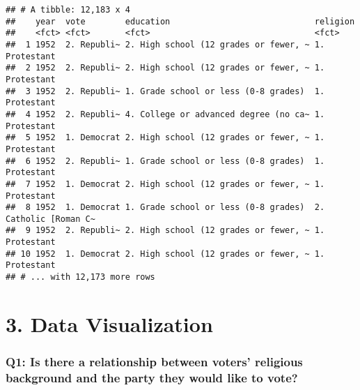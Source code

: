 \documentclass[
]{article}
\newenvironment{Shaded}{\begin{snugshade}}{\end{snugshade}}
\newcommand{\DataTypeTok}[1]{\textcolor[rgb]{0.13,0.29,0.53}{#1}}
\newcommand{\KeywordTok}[1]{\textcolor[rgb]{0.13,0.29,0.53}{\textbf{#1}}}
\newcommand{\NormalTok}[1]{#1}
\newcommand{\OperatorTok}[1]{\textcolor[rgb]{0.81,0.36,0.00}{\textbf{#1}}}
\newcommand{\StringTok}[1]{\textcolor[rgb]{0.31,0.60,0.02}{#1}}
\begin{document}
\begin{verbatim}
## # A tibble: 12,183 x 4
##    year  vote        education                             religion             
##    <fct> <fct>       <fct>                                 <fct>                
##  1 1952  2. Republi~ 2. High school (12 grades or fewer, ~ 1. Protestant        
##  2 1952  2. Republi~ 2. High school (12 grades or fewer, ~ 1. Protestant        
##  3 1952  2. Republi~ 1. Grade school or less (0-8 grades)  1. Protestant        
##  4 1952  2. Republi~ 4. College or advanced degree (no ca~ 1. Protestant        
##  5 1952  1. Democrat 2. High school (12 grades or fewer, ~ 1. Protestant        
##  6 1952  2. Republi~ 1. Grade school or less (0-8 grades)  1. Protestant        
##  7 1952  1. Democrat 2. High school (12 grades or fewer, ~ 1. Protestant        
##  8 1952  1. Democrat 1. Grade school or less (0-8 grades)  2. Catholic [Roman C~
##  9 1952  2. Republi~ 2. High school (12 grades or fewer, ~ 1. Protestant        
## 10 1952  1. Democrat 2. High school (12 grades or fewer, ~ 1. Protestant        
## # ... with 12,173 more rows
\end{verbatim}

\begin{Shaded}
\end{Shaded}

\hypertarget{data-visualization}{%
\section{3. Data Visualization}\label{data-visualization}}

\hypertarget{q1-is-there-a-relationship-between-voters-religious-background-and-the-party-they-would-like-to-vote}{%
\subsubsection{Q1: Is there a relationship between voters' religious
background and the party they would like to
vote?}\label{q1-is-there-a-relationship-between-voters-religious-background-and-the-party-they-would-like-to-vote}}
\end{document}
